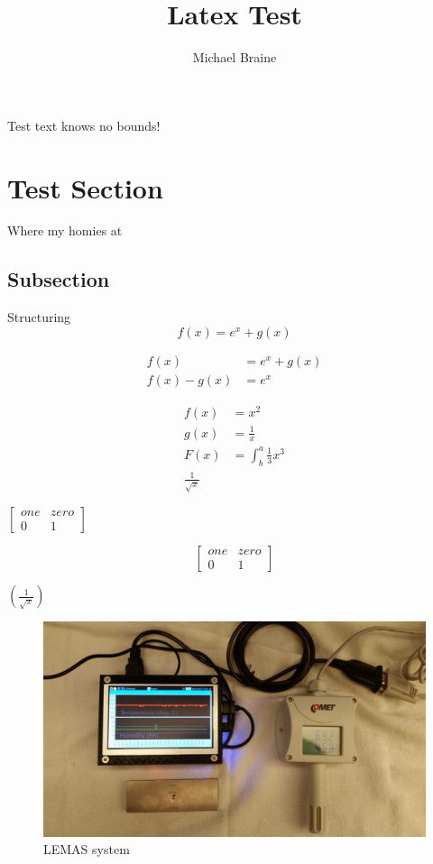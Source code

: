 \documentclass{proc}
\title{Latex Test}
\author{Michael Braine}
\begin{document}
  \maketitle
  \tableofcontents
  \listoffigures
  \newpage
  Test text knows no bounds!
  \section{Test Section}
  Where my homies at
  \subsection{Subsection}
  Structuring
  \begin{equation}
    f(x) = e^x + g(x)
  \end{equation}

  \begin{align*}
    f(x) &= e^x + g(x)\\
    f(x) - g(x) &= e^x
  \end{align*}

  \begin{align*}
    f(x) &= x^2\\
    g(x) &= \frac{1}{x}\\
    F(x) &= \int^a_b \frac{1}{3}x^3\\
    \frac{1}{\sqrt{x}}
  \end{align*}

  $\left[
    \begin{matrix}
      one & zero\\
      0 & 1
    \end{matrix}
  \right]$

  \begin{equation}
    \left[
      \begin{matrix}
        one & zero\\
        0 & 1
      \end{matrix}
    \right]
  \end{equation}

  $\left(\frac{1}{\sqrt{x}}\right)$

  \begin{figure}
    \includegraphics[width=\linewidth]{figures/index.jpeg}
    \caption{LEMAS system}
    \label{fig:LEMAS}
  \end{figure}
\end{document}
